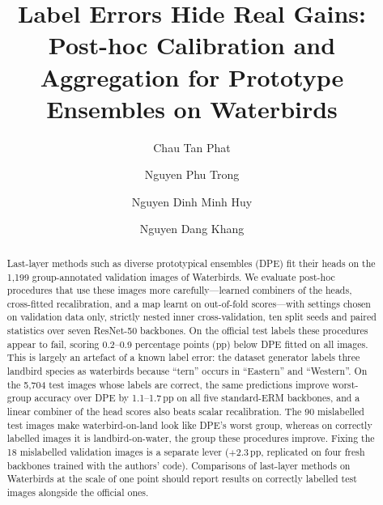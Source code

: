 \documentclass[runningheads]{llncs}
\newcommand{\pp}{\,pp}
\begin{document}
\title{Label Errors Hide Real Gains: Post-hoc Calibration and Aggregation for Prototype Ensembles on Waterbirds}
\author{Chau Tan Phat \and Nguyen Phu Trong \and Nguyen Dinh Minh Huy \and Nguyen Dang Khang}
\maketitle

\begin{abstract}
Last-layer methods such as diverse prototypical ensembles (DPE) fit their heads on the 1,199 group-annotated validation images of Waterbirds. We evaluate post-hoc procedures that use these images more carefully---learned combiners of the heads, cross-fitted recalibration, and a map learnt on out-of-fold scores---with settings chosen on validation data only, strictly nested inner cross-validation, ten split seeds and paired statistics over seven ResNet-50 backbones. On the official test labels these procedures appear to fail, scoring 0.2--0.9 percentage points (pp) below DPE fitted on all images. This is largely an artefact of a known label error: the dataset generator labels three landbird species as waterbirds because ``tern'' occurs in ``Eastern'' and ``Western''. On the 5,704 test images whose labels are correct, the same predictions improve worst-group accuracy over DPE by 1.1--1.7\pp{} on all five standard-ERM backbones, and a linear combiner of the head scores also beats scalar recalibration. The 90 mislabelled test images make waterbird-on-land look like DPE's worst group, whereas on correctly labelled images it is landbird-on-water, the group these procedures improve. Fixing the 18 mislabelled validation images is a separate lever ($+2.3$\pp, replicated on four fresh backbones trained with the authors' code). Comparisons of last-layer methods on Waterbirds at the scale of one point should report results on correctly labelled test images alongside the official ones.
\end{abstract}







\end{document}
